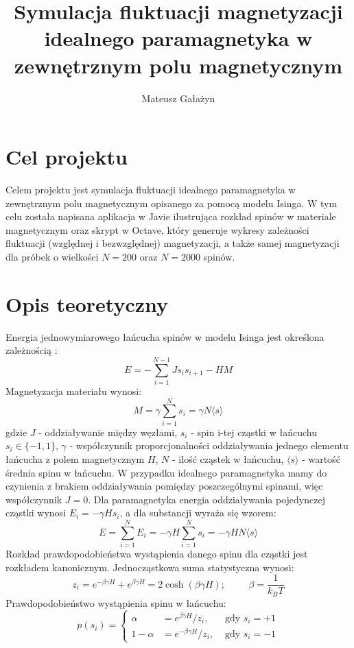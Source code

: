\documentclass[a4paper,10pt]{article}
\author{Mateusz Gałażyn}
\title{Symulacja fluktuacji magnetyzacji idealnego paramagnetyka w zewnętrznym polu magnetycznym}
\begin{document}
	\maketitle
	\section{Cel projektu}
	Celem projektu jest symulacja fluktuacji idealnego paramagnetyka w zewnętrznym polu magnetycznym opisanego za pomocą modelu Isinga. W tym celu została napisana aplikacja w Javie ilustrująca rozkład spinów w materiale magnetycznym oraz skrypt w Octave, który generuje wykresy zależności fluktuacji (względnej i bezwzględnej) magnetyzacji, a także samej magnetyzacji dla próbek o wielkości $N=200$ oraz $N=2000$ spinów.
	\section{Opis teoretyczny}
	Energia jednowymiarowego łańcucha spinów w modelu Isinga jest określona zależnością \cite{az}:
	\[ E = -\sum^{N-1}_{i=1} J s_{i} s_{i+1} - H M \]
	Magnetyzacja materiału wynosi:
	\begin{equation}
	\label{magnetyzacja}
	 M = \gamma \sum^{N}_{i=1}s_{i} = \gamma N \langle s \rangle 
	\end{equation}
	gdzie $J$ - oddziaływanie między węzłami, $s_{i}$ - spin i-tej cząstki w łańcuchu $s_{i} \in \{-1,1\}$, $\gamma$ - współczynnik proporcjonalności oddziaływania jednego elementu łańcucha z polem magnetycznym $H$, $N$ - ilość cząstek w łańcuchu, $\langle s \rangle$ - wartość średnia spinu w łańcuchu. W przypadku idealnego paramagnetyka mamy do czynienia z brakiem oddziaływania pomiędzy poszczególnymi spinami, więc współczynnik $J = 0$. Dla paramagnetyka energia oddziaływania pojedynczej cząstki wynosi $E_i = - \gamma H s_{i}$, a dla substancji wyraża się wzorem:
	\[ E = \sum^{N}_{i=1} E_{i} =-\gamma H \sum^{N}_{i=1}s_{i} = -\gamma H N \langle s \rangle\]
	Rozkład prawdopodobieństwa wystąpienia danego spinu dla cząstki jest rozkładem kanonicznym. Jednocząstkowa suma statystyczna wynosi\cite{az}:
	\[ z_{i} = e^{- \beta \gamma H } + e^{\beta \gamma H} = 2 \cosh(\beta \gamma H); \hspace{1cm} \beta = \frac{1}{k_{B}T}  \]
	Prawdopodobieństwo wystąpienia spinu w łańcuchu:
	\begin{equation}
	\label{alfa}
	p(s_i) = \left\{ \begin{array}{lll}
	\alpha & = e^{\beta \gamma H} / z_{i}, & \mbox{ gdy } s_i = +1 \\
	1-\alpha & = e^{ -\beta \gamma H} / z_{i}, & \mbox{ gdy } s_i = -1
	\end{array} \right.
	\end{equation}
\end{document}
